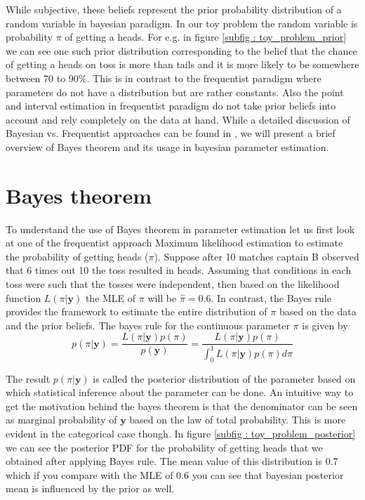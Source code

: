 While subjective, these beliefs represent the prior probability distribution of a random variable in bayesian paradigm. In our toy problem the random variable is probability $\pi$ of getting a heads. For e.g. in figure \ref{subfig : toy_problem_prior} we can see one such prior distribution corresponding to the belief that the chance of getting a heads on toss is more than tails and it is more likely to be somewhere between 70 to 90\%. This is in contrast to the frequentist paradigm where parameters do not have a distribution but are rather constants. Also the point and interval estimation in frequentist paradigm do not take prior beliefs into account and rely completely on the data at hand. While a detailed discussion of Bayesian vs. Frequentist approaches can be found in \citet{lesaffre_bayesian_2012}, we will present a brief overview of Bayes theorem and its usage in bayesian parameter estimation.\\

\section{Bayes theorem}
\label{sec : bayes_theorem}
To understand the use of Bayes theorem in parameter estimation let us first look at one of the frequentist approach Maximum likelihood estimation to estimate the probability of getting heads ($\pi$). Suppose after 10 matches captain B observed that 6 times out 10 the toss resulted in heads. Assuming that conditions in each toss were such that the tosses were independent, then based on the likelihood function $L(\pi|\boldsymbol{y})$ the MLE of $\pi$ will be $\hat{\pi} = 0.6$. In contrast, the Bayes rule provides the framework to estimate the entire distribution of $\pi$ based on the data and the prior beliefs. The bayes rule for the continuous parameter $\pi$ is given by\\

\begin{equation}
\label{eq : bayes_rule}
p(\pi|\boldsymbol{y}) = \dfrac{L(\pi|\boldsymbol{y})p(\pi)}{p(\boldsymbol{y})} = \dfrac{L(\pi|\boldsymbol{y})p(\pi)}{\int_{0}^{1}L(\pi|\boldsymbol{y})p(\pi)d\pi}
\end{equation}

The result $p(\pi|\boldsymbol{y})$ is called the posterior distribution of the parameter based on which statistical inference about the parameter can be done. An intuitive way to get the motivation behind the bayes theorem is that the denominator can be seen as marginal probability of $\boldsymbol{y}$ based on the law of total probability. This is more evident in the categorical case though. In figure \ref{subfig : toy_problem_posterior} we can see the posterior PDF for the probability of getting heads that we obtained after applying Bayes rule. The mean value of this distribution is 0.7 which if you compare with the MLE of 0.6 you can see that bayesian posterior mean is influenced by the prior as well.\\

